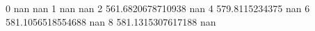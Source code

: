 0 nan nan
1 nan nan
2 561.6820678710938 nan
4 579.8115234375 nan
6 581.1056518554688 nan
8 581.1315307617188 nan
